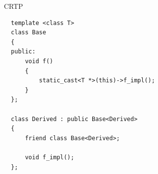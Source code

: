 \documentclass[unknownkeysallowed,xcolor=table]{beamer}
\begin{document}
\begin{frame}[fragile]{CRTP}
  \begin{lstlisting}
  template <class T>
  class Base
  {
  public:
      void f()
      {
          static_cast<T *>(this)->f_impl();
      }
  };

  class Derived : public Base<Derived>
  {
      friend class Base<Derived>;

      void f_impl();
  };
  \end{lstlisting}
\end{frame}
\end{document}
